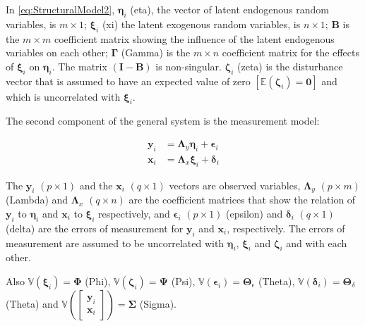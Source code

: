 In \eqref{eq:StructuralModel2}, \(\bm{\eta}_{i}\) (eta), the vector
of latent endogenous random variables, is \(m\times1\); \(\bm{\xi}_{i}\)
(xi) the latent exogenous random variables, is \(n\times1\); \(\mathbf{B}\)
is the \(m\times m\) coefficient matrix showing the influence of the
latent endogenous variables on each other; \(\bm{\Gamma}\) (Gamma)
is the \(m\times n\) coefficient matrix for the effects of \(\bm{\xi}_{i}\)
on \(\bm{\eta}_{i}\). The matrix \(\left(\mathbf{I}-\mathbf{B}\right)\)
is non-singular. \(\bm{\zeta}_{i}\) (zeta) is the disturbance vector
that is assumed to have an expected value of zero \(\left[\mathbb{E}\left(\bm{\zeta}_{i}\right)=\mathbf{0}\right]\)
and which is uncorrelated with \(\bm{\xi}_{i}\).

The second component of the general system is the measurement model:


\begin{align}
\mathbf{y}_{i} & =\bm{\Lambda}_{y}\bm{\eta}_{i}+\bm{\epsilon}_{i}\label{eq:MeasurementModel1}\\
\mathbf{x}_{i} & =\bm{\Lambda}_{x}\bm{\xi}_{i}+\bm{\delta}_{i}\label{eq:MeasurementModel2}
\end{align}

The \(\mathbf{y}_{i}\) \(\left(p\times1\right)\) and the \(\mathbf{x}_{i}\)
\(\left(q\times1\right)\) vectors are observed variables, \(\bm{\Lambda}_{y}\)
\(\left(p\times m\right)\) (Lambda) and \(\bm{\Lambda}_{x}\) \(\left(q\times n\right)\)
are the coefficient matrices that show the relation of \(\mathbf{y}_{i}\)
to \(\bm{\eta}_{i}\) and \(\mathbf{x}_{i}\) to \(\bm{\xi}_{i}\) respectively,
and \(\bm{\epsilon}_{i}\) \(\left(p\times1\right)\) (epsilon) and \(\bm{\delta}_{i}\)
\(\left(q\times1\right)\) (delta) are the errors of measurement for
\(\mathbf{y}_{i}\) and \(\mathbf{x}_{i}\), respectively. The errors
of measurement are assumed to be uncorrelated with \(\bm{\eta}_{i}\),
\(\bm{\xi}_{i}\) and \(\bm{\zeta}_{i}\) and with each other.

Also \(\mathbb{V}\left(\bm{\xi}_{i}\right)=\bm{\Phi}\) (Phi), \(\mathbb{V}\left(\bm{\zeta}_{i}\right)=\bm{\Psi}\)
(Psi), \(\mathbb{V}\left(\bm{\epsilon}_{i}\right)=\bm{\Theta}_{\epsilon}\)
(Theta), \(\mathbb{V}\left(\bm{\delta}_{i}\right)=\bm{\Theta}_{\delta}\)
(Theta) and \(\mathbb{V}\left(\begin{bmatrix}\mathbf{y}_{i}\\ \mathbf{x}_{i} \end{bmatrix}\right)=\bm{\Sigma}\) (Sigma).

